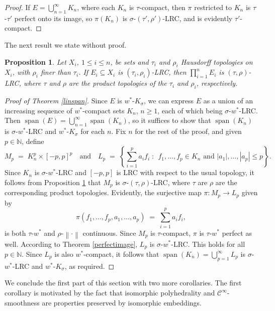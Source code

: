 \documentclass[12pt,reqno]{amsart}
\newcommand{\lspan}[1]{\ensuremath{\aspan({#1})}}
\newcommand{\map}[3]{\ensuremath{{#1}:{#2}\to{#3}}}
\newcommand{\N}{\mathbb{N}}
\newcommand{\ndot}{\ensuremath{\left\|\cdot\right\|}}
\newcommand{\oneton}[2]{\ensuremath{{#1}_1,\ldots,{#1}_{#2}}}
\newcommand{\set}[2]{\ensuremath{\left\{{#1}\;:\;\,{#2}\right\}}}
\newcommand{\weakstar}{\ensuremath{w^*}}
\DeclareMathOperator{\aspan}{span}
\newtheorem{prop}[thm]{Proposition}
\theoremstyle{definition}
\begin{document}
\begin{proof} If $E = \bigcup_{n=1}^\infty K_n$, where each $K_n$ is $\tau$-compact, then $\pi$ restricted to $K_n$ is $\tau$-$\tau'$ perfect onto its image, so $\pi(K_n)$ is $\sigma$-$(\tau',\rho')$-LRC, and is evidently $\tau'$-compact.
\end{proof}

The next result we state without proof.

\begin{prop}\label{prodLRC}
Let $X_i$, $1 \leqslant i \leqslant n$, be sets and $\tau_i$ and $\rho_i$ Hausdorff topologies on $X_i$, with $\rho_i$ finer than $\tau_i$. If $E_i \subseteq X_i$ is $(\tau_i,\rho_i)$-LRC, then $\prod_{i=1}^n E_i$ is $(\tau,\rho)$-LRC, where $\tau$ and $\rho$ are the product topologies of the $\tau_i$ and $\rho_i$, respectively.
\end{prop}

\begin{proof}[Proof of Theorem \ref{linspan}]
Since $E$ is $\weakstar$-$K_\sigma$, we can express $E$ as a union of an increasing sequence of $\weakstar$-compact sets $K_n$, $n \geqslant 1$, each of which being $\sigma$-$\weakstar$-LRC. Then $\lspan{E} = \bigcup_{n=1}^\infty \lspan{K_n}$, so it suffices to show that $\lspan{K_n}$ is $\sigma$-$\weakstar$-LRC and $\weakstar$-$K_\sigma$ for each $n$. Fix $n$ for the rest of the proof, and given $p \in \N$, define
\[
M_p \;=\; K_n^p \times [-p,p]^p \quad\text{and}\quad L_p \;=\; \set{\sum_{i=1}^p a_i f_i}{\oneton{f}{p} \in K_n \text{ and }|a_1|,\dots,|a_p| \leqslant p}.
\]
Since $K_n$ is $\sigma$-$\weakstar$-LRC and $[-p,p]$ is LRC with respect to the usual topology, it follows from Proposition \ref{prodLRC} that $M_p$ is $\sigma$-$(\tau,\rho)$-LRC, where $\tau$ are $\rho$ are the corresponding product topologies. Evidently, the surjective map $\map{\pi}{M_p}{L_p}$ given by
\[
\pi(f_1,\dots,f_p,a_1,\dots,a_p) \;=\; \sum_{i=1}^p a_i f_i,
\]
is both $\tau$-$\weakstar$ and $\rho$-$\ndot$ continuous. Since $M_p$ is $\tau$-compact, $\pi$ is $\tau$-$\weakstar$ perfect as well. According to Theorem \ref{perfectimage}, $L_p$ is $\sigma$-$\weakstar$-LRC. This holds for all $p \in \N$. Since $L_p$ is also $\weakstar$-compact, it follows that $\lspan{K_n} = \bigcup_{p=1}^\infty L_p$ is $\sigma$-$\weakstar$-LRC and $\weakstar$-$K_\sigma$, as required.
\end{proof}

We conclude the first part of this section with two more corollaries. The first corollary is motivated by the fact that isomorphic polyhedrality and $\mathscr{C}^\infty$-smoothness are properties preserved by isomorphic embeddings.
\end{document}
